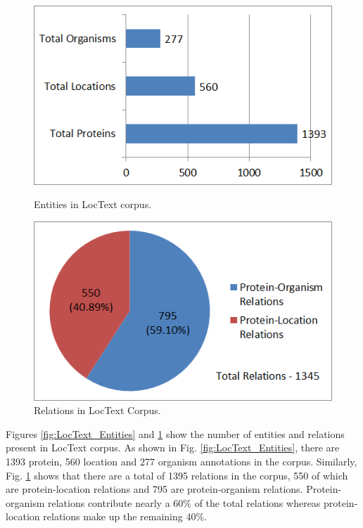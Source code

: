 \begin{figure}
\centering
\begin{minipage}{.5\textwidth}
  \centering
  \includegraphics[width=.95\textwidth]{figures/ProtLocOrg_Distribution.png}
  \caption{Entities in LocText corpus.}
  \label{fig:LocText_Entities}
\end{minipage}%
\begin{minipage}{.5\textwidth}
  \centering
  \includegraphics[width=.95\textwidth]{figures/AllRelationsPie.png}
  \caption{Relations in LocText Corpus.}
  \label{fig:LocText_Relations}
\end{minipage}
\end{figure}

Figures \ref{fig:LocText_Entities} and \ref{fig:LocText_Relations} show the number of entities and relations present in LocText corpus. As shown in  Fig. \ref{fig:LocText_Entities}, there are 1393 protein, 560 location and 277 organism annotations in the corpus. Similarly, Fig. \ref{fig:LocText_Relations} shows that there are a total of 1395 relations in the corpus, 550 of which are protein-location relations and 795 are protein-organism relations. Protein-organism relations contribute nearly a 60\% of the total relations whereas protein-location relations make up the remaining 40\%.

